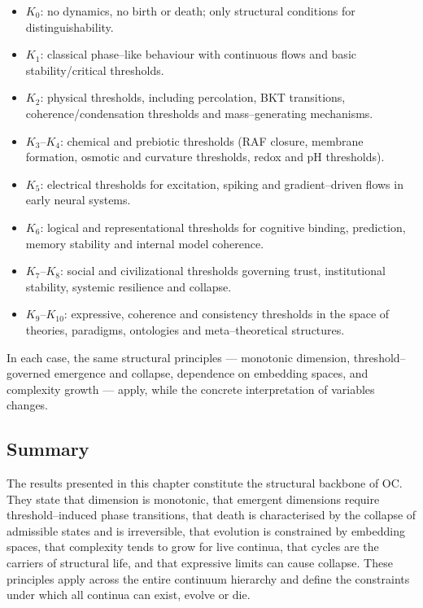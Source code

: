 \begin{itemize}
    \item \(K_0\): no dynamics, no birth or death; only structural conditions for distinguishability.
    \item \(K_1\): classical phase–like behaviour with continuous flows and basic stability/critical thresholds.
    \item \(K_2\): physical thresholds, including percolation, BKT transitions, coherence/condensation thresholds and mass–generating mechanisms.
    \item \(K_3\)–\(K_4\): chemical and prebiotic thresholds (RAF closure, membrane formation, osmotic and curvature thresholds, redox and pH thresholds).
    \item \(K_5\): electrical thresholds for excitation, spiking and gradient–driven flows in early neural systems.
    \item \(K_6\): logical and representational thresholds for cognitive binding, prediction, memory stability and internal model coherence.
    \item \(K_7\)–\(K_8\): social and civilizational thresholds governing trust, institutional stability, systemic resilience and collapse.
    \item \(K_9\)–\(K_{10}\): expressive, coherence and consistency thresholds in the space of theories, paradigms, ontologies and meta–theoretical structures.
\end{itemize}

In each case, the same structural principles --- monotonic dimension, threshold–governed emergence and collapse, dependence on embedding spaces, and complexity growth --- apply, while the concrete interpretation of variables changes.

\subsection{Summary}

The results presented in this chapter constitute the structural backbone of OC.
They state that dimension is monotonic, that emergent dimensions require threshold–induced phase transitions, that death is characterised by the collapse of admissible states and is irreversible, that evolution is constrained by embedding spaces, that complexity tends to grow for live continua, that cycles are the carriers of structural life, and that expressive limits can cause collapse.
These principles apply across the entire continuum hierarchy and define the constraints under which all continua can exist, evolve or die.
